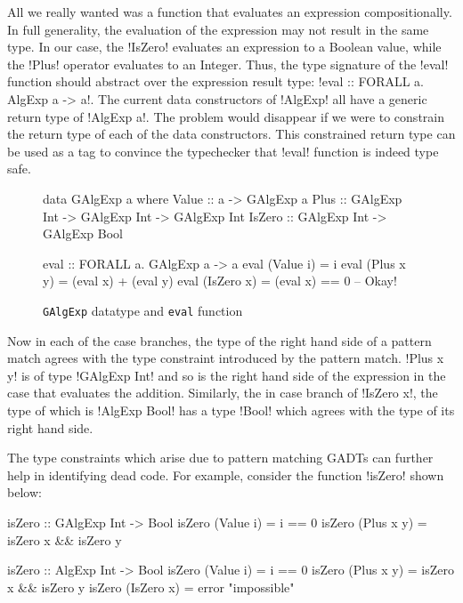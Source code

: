 \documentclass[screen,nonacm]{acmart}
\begin{document}
All we really wanted was a function that evaluates an expression compositionally. In full generality, the evaluation of the expression may not result in the same type. In our case, the !IsZero! evaluates an expression to a Boolean value, while the !Plus! operator evaluates to an Integer. Thus, the type signature of the !eval! function should abstract over the expression result type: !eval :: FORALL a. AlgExp a -> a!. The current data constructors of !AlgExp! all have a generic return type of !AlgExp a!. The problem would disappear if we were to constrain the return type of each of the data constructors. This constrained return type can be used as a tag to convince the typechecker that !eval! function is indeed type safe.
\begin{figure}[ht]
\centering
\begin{minipage}[ht]{0.6\linewidth}
\begin{code}
data GAlgExp a where
  Value  :: a                          -> GAlgExp a
  Plus   :: GAlgExp Int -> GAlgExp Int -> GAlgExp Int
  IsZero :: GAlgExp Int                -> GAlgExp Bool
\end{code}
\end{minipage}%
\begin{minipage}[ht]{0.4\linewidth}
\begin{code}
eval :: FORALL a. GAlgExp a -> a
eval (Value i) = i
eval (Plus x y) = (eval x) + (eval y)
eval (IsZero x) = (eval x) == 0 -- Okay!
\end{code}
\end{minipage}%
\caption{\texttt{GAlgExp} datatype and \texttt{eval} function}
\label{fig:galgexp-eval}
\end{figure}

Now in each of the case branches, the type of the right hand side of a pattern match agrees with the type constraint introduced by the pattern match. !Plus x y! is of type !GAlgExp Int! and so is the right hand side of the expression in the case that evaluates the addition. Similarly, the in case branch of !IsZero x!, the type of which is !AlgExp Bool! has a type !Bool! which agrees with the type of its right hand side.

The type constraints which arise due to pattern matching GADTs can further help in identifying dead code\cite{xi_dead_1998,graf_lower_2020}. For example, consider the function !isZero! shown below:

\begin{minipage}[ht]{0.5\linewidth}
\begin{CenteredBox}
\begin{code}
isZero :: GAlgExp Int -> Bool
isZero (Value i) = i == 0
isZero (Plus x y) = isZero x && isZero y
\end{code}
\end{CenteredBox}
\end{minipage}%
\begin{minipage}{0.5\linewidth}
\begin{code}
isZero :: AlgExp Int -> Bool
isZero (Value i) = i == 0
isZero (Plus x y) = isZero x && isZero y
isZero (IsZero x) = error "impossible"
\end{code}
\end{minipage}
\end{document}
